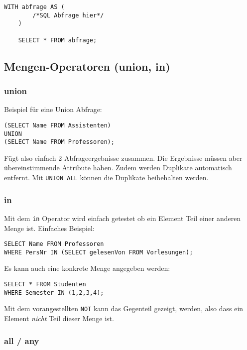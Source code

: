 \begin{lstlisting}[caption={with Operator},label=lst:with]
	WITH abfrage AS (
	    /*SQL Abfrage hier*/
	)
	
	SELECT * FROM abfrage;
\end{lstlisting}


\subsection{Mengen-Operatoren (union, in)}\label{sec:mengen_operatoren}

\subsubsection{union}
Beispiel für eine Union Abfrage:

\begin{lstlisting}[caption={Union Abfrage Beispiel},label=lst:union_bsp]
(SELECT Name FROM Assistenten)
UNION
(SELECT Name FROM Professoren);
\end{lstlisting}

Fügt also einfach 2 Abfrageergebnisse zusammen. Die Ergebnisse müssen aber übereinstimmende Attribute haben. Zudem werden Duplikate automatisch entfernt. Mit \texttt{UNION ALL} können die Duplikate beibehalten werden.

\subsubsection{in}\label{sec:in_operator}

Mit dem \texttt{in} Operator wird einfach getestet ob ein Element Teil einer anderen Menge ist. Einfaches Beispiel:
\begin{lstlisting}[caption={Beispiel in Operator},label=lst:in_bsp]
SELECT Name FROM Professoren
WHERE PersNr IN (SELECT gelesenVon FROM Vorlesungen);
\end{lstlisting}

Es kann auch eine konkrete Menge angegeben werden:

\begin{lstlisting}[caption={Diskrete Menge IN}]
SELECT * FROM Studenten
WHERE Semester IN (1,2,3,4);
\end{lstlisting}


Mit dem vorangestellten \texttt{NOT} kann das Gegenteil gezeigt, werden, also dass ein Element \textit{nicht} Teil dieser Menge ist.

\subsubsection{all / any}

